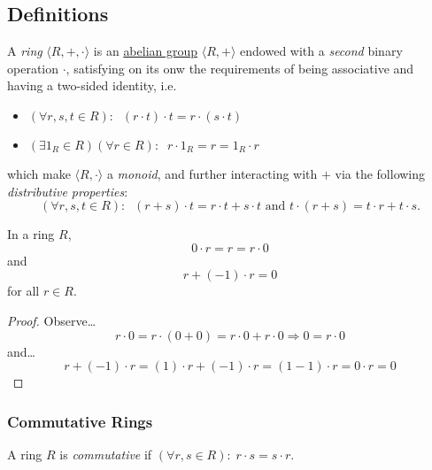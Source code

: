 \subsection{Definitions}\label{ringdefinition}
A \emph{ring} $\langle R, +, \cdot \rangle$ is an \hyperref[abeliangroupdefinition]{abelian group} $\langle R,+ \rangle$ endowed with a \emph{second}
binary operation $\cdot$, satisfying on its onw the requirements of being associative and having a two-sided identity, i.e.
\begin{itemize}
  \item $(\forall r,s,t \in R): \; \; (r \cdot t) \cdot t = r \cdot (s \cdot t)$
  \item $(\exists 1_R \in R) (\forall r \in R): \; \; r \cdot 1_R = r = 1_R \cdot r$
\end{itemize}
which make $\langle R, \cdot \rangle$ a \emph{monoid}, and further interacting with $+$ via the following \emph{distributive properties}:
$$(\forall r,s,t \in R): \; \; (r+s)\cdot t = r \cdot t + s \cdot t \textrm{ and } t \cdot (r + s) = t \cdot r + t \cdot s.$$

\begin{lemma}
In a ring $R$,
$$0 \cdot r = r = r \cdot 0$$
and
$$r + (-1) \cdot r = 0$$
for all $r \in R.$
\end{lemma}

\begin{proof}
Observe\dots
$$r \cdot 0 = r \cdot (0 + 0) = r \cdot 0 + r \cdot 0 \Rightarrow 0 = r \cdot 0$$
and\dots
$$r + (-1) \cdot r = (1) \cdot r + (-1) \cdot r = (1 - 1) \cdot r = 0 \cdot r = 0$$
\end{proof}

\subsubsection{Commutative Rings}\label{commutativeringdefinition}
A ring $R$ is \emph{commutative} if $(\forall r,s \in R): \; r \cdot s = s \cdot r$.